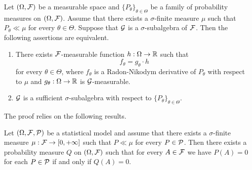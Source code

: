 \begin{theorem}
Let $(\Omega, {\mathcal F})$ be a measurable space and $\big\{P_{\theta}\big\}_{\theta \in \Theta}$ be a family of probability measures on $(\Omega, {\mathcal F})$. Assume that there exists a $\sigma$-finite measure $\mu$ such that $P_{\theta} \ll \mu$ for every $\theta \in \Theta$. Suppose that ${\mathcal G}$ is a $\sigma$-subalgebra of ${\mathcal F}$. Then the following assertions are equivalent.
\begin{enumerate}[label=\emph{\textbf{(\roman*)}}, leftmargin=*]
\item There exists ${\mathcal F}$-measurable function $h:\Omega \rightarrow {\mathbb R}$ such that 
$$f_{\theta}= g_{\theta}\cdot h$$
for every $\theta \in \Theta$, where $f_{\theta}$ is a Radon-Nikodym derivative of $P_{\theta}$ with respect to $\mu$ and $g_{\theta}:\Omega \rightarrow {\mathbb R}$ is ${\mathcal G}$-measurable.
\item ${\mathcal G}$ is a sufficient $\sigma$-subalgebra with respect to $\big\{P_{\theta}\big\}_{\theta\in \Theta}$.
\end{enumerate}
\end{theorem}
\noindent 
The proof relies on the following results. 

\begin{proposition}
Let $(\Omega, {\mathcal F}, {\mathcal P})$ be a statistical model and assume that there exists a $\sigma$-finite measure $\mu:{\mathcal F}\rightarrow [0,+\infty]$ such that $P \ll \mu$ for every $P\in {\mathcal P}$. Then there exists a probability measure $Q$ on $(\Omega, {\mathcal F})$ such that for every $A\in {\mathcal F}$ we have $P(A) = 0$ for each $P\in {\mathcal P}$ if and only if $Q(A)=0$.
\end{proposition}






























































\small



